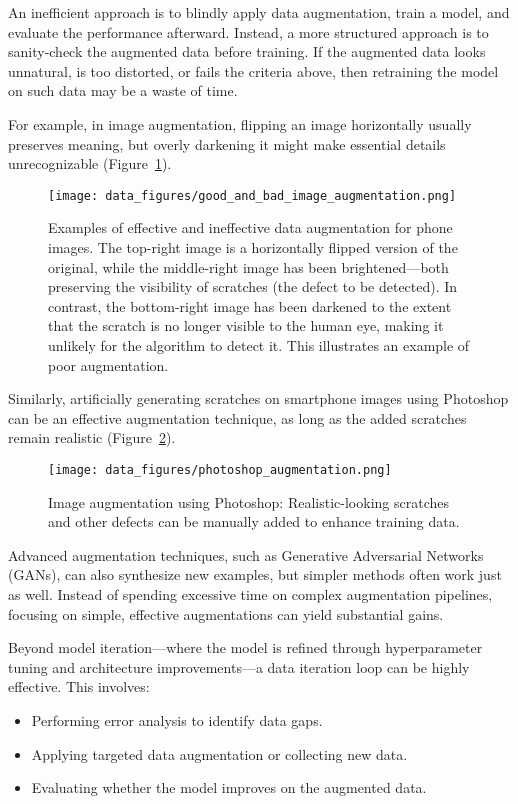 \documentclass[12pt,openany]{book}
\begin{document}
An inefficient approach is to blindly apply data augmentation, train a model, and evaluate the performance afterward. Instead, a more structured approach is to sanity-check the augmented data before training. If the augmented data looks unnatural, is too distorted, or fails the criteria above, then retraining the model on such data may be a waste of time. \newline

For example, in image augmentation, flipping an image horizontally usually preserves meaning, but overly darkening it might make essential details unrecognizable (Figure~\ref{fig:good_and_bad_image_augmentation}). 

\begin{figure}[H]
    \centering
    \texttt{[image: data\_figures/good\_and\_bad\_image\_augmentation.png]}
    \caption{Examples of effective and ineffective data augmentation for phone images. The top-right image is a horizontally flipped version of the original, while the middle-right image has been brightened—both preserving the visibility of scratches (the defect to be detected). In contrast, the bottom-right image has been darkened to the extent that the scratch is no longer visible to the human eye, making it unlikely for the algorithm to detect it. This illustrates an example of poor augmentation.}
    \label{fig:good_and_bad_image_augmentation}
\end{figure}

Similarly, artificially generating scratches on smartphone images using Photoshop can be an effective augmentation technique, as long as the added scratches remain realistic (Figure~\ref{fig:photoshop_augmentation}).

\begin{figure}[H]
    \centering
    \texttt{[image: data\_figures/photoshop\_augmentation.png]}
    \caption{Image augmentation using Photoshop: Realistic-looking scratches and other defects can be manually added to enhance training data.}
    \label{fig:photoshop_augmentation}
\end{figure}

Advanced augmentation techniques, such as Generative Adversarial Networks (GANs), can also synthesize new examples, but simpler methods often work just as well. Instead of spending excessive time on complex augmentation pipelines, focusing on simple, effective augmentations can yield substantial gains.

Beyond model iteration—where the model is refined through hyperparameter tuning and architecture improvements—a data iteration loop can be highly effective. This involves:
\begin{itemize}
    \item Performing error analysis to identify data gaps.
    \item Applying targeted data augmentation or collecting new data.
    \item Evaluating whether the model improves on the augmented data.
\end{itemize}
\end{document}
